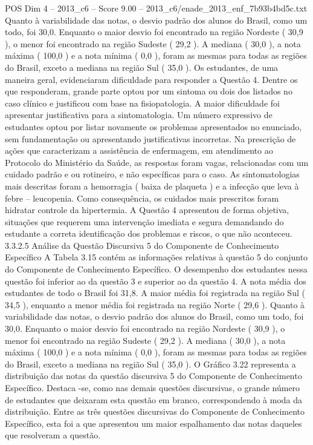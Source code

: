 \begin{textsample}{POS Dim 4 – 2013\_c6 – Score 9.00 – 2013\_c6/enade\_2013\_enf\_7b93b4bd5c.txt}
Quanto à variabilidade das notas, o desvio padrão dos alunos do Brasil, como um todo, foi 30,0.
Enquanto o maior desvio foi encontrado na região Nordeste ( 30,9 ), o menor foi encontrado na região Sudeste ( 29,2 ).
A mediana ( 30,0 ), a nota máxima ( 100,0 ) e a nota mínima ( 0,0 ), foram as mesmas para todas as regiões do Brasil, exceto a mediana na região Sul ( 35,0 ).
Os estudantes, de uma maneira geral, evidenciaram dificuldade para responder a Questão 4.
Dentre os que responderam, grande parte optou por um sintoma ou dois dos listados no caso clínico e justificou com base na fisiopatologia.
A maior dificuldade foi apresentar justificativa para a sintomatologia.
Um número expressivo de estudantes optou por listar novamente os problemas apresentados no enunciado, sem fundamentação ou apresentando justificativas incorretas.
Na prescrição de ações que caracterizam a assistência de enfermagem, em atendimento ao Protocolo do Ministério da Saúde, as respostas foram vagas, relacionadas com um cuidado padrão e ou rotineiro, e não específicas para o caso.
As sintomatologias mais descritas foram a hemorragia ( baixa de plaqueta ) e a infecção que leva à febre – leucopenia.
Como consequência, os cuidados mais prescritos foram hidratar controle da hipertermia.
A Questão 4 apresentou de forma objetiva, situações que requerem uma intervenção imediata e segura demandando do estudante a correta identificação dos problemas e riscos, o que não aconteceu. 3.3.2.5 Análise da Questão Discursiva 5 do Componente de Conhecimento Específico A Tabela 3.15 contém as informações relativas à questão 5 do conjunto do Componente de Conhecimento Específico.
O desempenho dos estudantes nessa questão foi inferior ao da questão 3 e superior ao da questão 4.
A nota média dos estudantes de todo o Brasil foi 31,8.
A maior média foi registrada na região Sul ( 34,5 ), enquanto a menor média foi registrada na região Norte ( 29,6 ).
Quanto à variabilidade das notas, o desvio padrão dos alunos do Brasil, como um todo, foi 30,0.
Enquanto o maior desvio foi encontrado na região Nordeste ( 30,9 ), o menor foi encontrado na região Sudeste ( 29,2 ).
A mediana ( 30,0 ), a nota máxima ( 100,0 ) e a nota mínima ( 0,0 ), foram as mesmas para todas as regiões do Brasil, exceto a mediana na região Sul ( 35,0 ).
O Gráfico 3.22 representa a distribuição das notas da questão discursiva 5 do Componente de Conhecimento Específico.
Destaca -se, como nas demais questões discursivas, o grande número de estudantes que deixaram esta questão em branco, correspondendo à moda da distribuição.
Entre as três questões discursivas do Componente de Conhecimento Específico, esta foi a que apresentou um maior espalhamento das notas daqueles que resolveram a questão.

\end{textsample}
